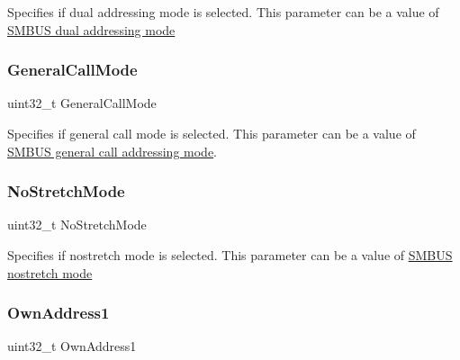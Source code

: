 Specifies if dual addressing mode is selected. This parameter can be a value of \hyperlink{group___s_m_b_u_s__dual__addressing__mode}{S\+M\+B\+US dual addressing mode} \mbox{\label{struct_s_m_b_u_s___init_type_def_afc70f58c0935194064d720779fbf22b5}} 
\subsubsection{\texorpdfstring{General\+Call\+Mode}{GeneralCallMode}}
{\footnotesize\ttfamily uint32\+\_\+t General\+Call\+Mode}

Specifies if general call mode is selected. This parameter can be a value of \hyperlink{group___s_m_b_u_s__general__call__addressing__mode}{S\+M\+B\+US general call addressing mode}. \mbox{\label{struct_s_m_b_u_s___init_type_def_a47971fd08a9784eddaa3d83fb998030c}} 
\subsubsection{\texorpdfstring{No\+Stretch\+Mode}{NoStretchMode}}
{\footnotesize\ttfamily uint32\+\_\+t No\+Stretch\+Mode}

Specifies if nostretch mode is selected. This parameter can be a value of \hyperlink{group___s_m_b_u_s__nostretch__mode}{S\+M\+B\+US nostretch mode} \mbox{\label{struct_s_m_b_u_s___init_type_def_a8abec5c168e27bf11b2808c1450bdeda}} 
\subsubsection{\texorpdfstring{Own\+Address1}{OwnAddress1}}
{\footnotesize\ttfamily uint32\+\_\+t Own\+Address1}

